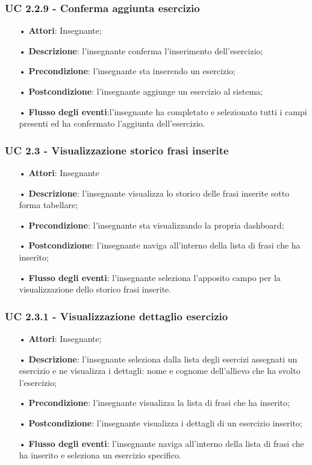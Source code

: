 \subsubsection{UC 2.2.9 - Conferma aggiunta esercizio}
\begin{itemize}
	\item[•] \textbf{Attori}: Insegnante;
	\item[•] \textbf{Descrizione}: l'insegnante conferma l'inserimento dell'esercizio;
	\item[•] \textbf{Precondizione}: l'insegnante sta inserendo un esercizio;
	\item[•] \textbf{Postcondizione}: l'insegnante aggiunge un esercizio al sistema;
	\item[•] \textbf{Flusso degli eventi}:l'insegnante ha completato e selezionato tutti i campi presenti ed ha confermato l'aggiunta dell'esercizio.
\end{itemize}


\subsubsection{UC 2.3 - Visualizzazione storico frasi inserite}
\begin{itemize}
	\item[•] \textbf{Attori}: Insegnante	   
	\item[•] \textbf{Descrizione}: l'insegnante visualizza lo storico delle frasi inserite sotto forma tabellare; 
	\item[•] \textbf{Precondizione}: l'insegnante sta visualizzando la propria dashboard;
	\item[•] \textbf{Postcondizione}: l'insegnante naviga all'interno della lista di frasi che ha inserito;
	\item[•] \textbf{Flusso degli eventi}: l'insegnante seleziona l'apposito campo per la visualizzazione dello storico frasi inserite.
\end{itemize}


\subsubsection{UC 2.3.1 - Visualizzazione dettaglio esercizio}
\begin{itemize}
	\item[•] \textbf{Attori}: Insegnante;
	\item[•] \textbf{Descrizione}: l'insegnante seleziona dalla lista degli esercizi assegnati un esercizio e ne visualizza i dettagli: nome e cognome dell'allievo che ha svolto l'esercizio;
	\item[•] \textbf{Precondizione}: l'insegnante visualizza la lista di frasi che ha inserito;
	\item[•] \textbf{Postcondizione}: l'insegnante visualizza i dettagli di un esercizio inserito;
	\item[•] \textbf{Flusso degli eventi}: l'insegnante naviga all'interno della lista di frasi che ha inserito e seleziona un esercizio specifico.
\end{itemize}


